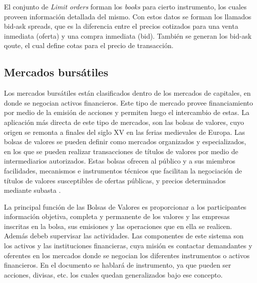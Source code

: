 El conjunto de \emph{Limit orders} forman los \emph{books} para cierto
instrumento, los cuales proveen información detallada del mismo. Con estos
datos se forman los llamados bid-ask spreads, que es la diferencia entre el
precios cotizados para una venta inmediata (oferta) y una compra inmediata
(bid).  También se generan los bid-ask qoute, el cual define cotas para el
precio de transacción.

\subsection{Mercados bursátiles}
Los mercados bursátiles están clasificados dentro de los mercados de capitales,
en donde se negocian activos financieros. Este tipo de mercado provee
financiamiento por medio de la emisión de acciones y permiten luego el
intercambio de estas. La aplicación más directa de este tipo de mercados, son
las bolsas de valores, cuyo origen se remonta a finales del siglo XV en las
ferias medievales de Europa. Las bolsas de valores se pueden definir como
mercados organizados y especializados, en los que se pueden realizar
transacciones de títulos de valores por medio de intermediarios autorizados.
Estas bolsas ofrecen al público y a sus miembros facilidades, mecanismos e
instrumentos técnicos que facilitan la negociación de títulos de valores
susceptibles de ofertas públicas, y precios determinados mediante subasta
\cite{levine1998stock}.

La principal función de las Bolsas de Valores es proporcionar a los
participantes información objetiva, completa y permanente de los valores y las
empresas inscritas en la bolsa, sus emisiones y las operaciones que en ella se
realicen. Además debeb supervisar las actividades. Las componentes de este
sistema son los activos y las instituciones financieras, cuya misión es
contactar demandantes y oferentes en los mercados donde se negocian los
diferentes instrumentos o activos financieros. En el documento se hablará de
instrumento, ya que pueden ser acciones, divisas, etc. los cuales quedan
generalizados bajo ese concepto.

